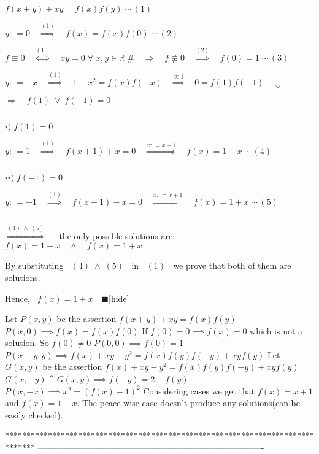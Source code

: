 \begin{solution}

$ \boxed { f(x+y) + xy = f(x)f(y) } \; \cdots \, (1) $

$ y: \, = 0 \quad \stackrel {(1)} {\Longrightarrow} \quad \boxed { f(x) = f(x)f(0) } \; \cdots \, (2) $

$ f \equiv 0 \quad \stackrel {(1)} {\Longleftrightarrow} \quad xy = 0 \; \forall \; x, y \in \mathbb{R} \; \# \quad \Longrightarrow \quad f \not\equiv 0 \quad \stackrel {(2)} {\Longrightarrow}  \quad \boxed { f(0) = 1 } \; \cdots \, (3) $

$ y: \, = -x \quad \stackrel {(1)} {\Longrightarrow} \quad 1 - x^2 = f(x)f(-x) \quad \stackrel {x: \, 1} {\Longrightarrow} \quad 0 = f(1)f(-1) \quad \Downarrow $  

$ \Longrightarrow \quad \boxed{ f(1) \; \vee \; f(-1) = 0 } $

$~$

$ i) \; f(1) = 0 $

$ y: \, = 1 \quad \stackrel {(1)} {\Longrightarrow} \quad f(x+1) + x = 0 \quad \stackrel {x: \, = x-1} {\Longrightarrow} \quad \boxed { f(x) = 1 - x } \; \cdots \, (4) $

$~$

$ ii) \; f(-1) = 0 $

$ y: \, = -1 \quad \stackrel {(1)} {\Longrightarrow} \quad f(x-1) - x = 0 \quad \stackrel {x: \, = x+1} {\Longrightarrow} \quad \boxed { f(x) = 1 + x } \; \cdots \, (5) $

$~$

$ \stackrel {(4) \; \wedge \; (5)} {\Longrightarrow} $ $~$ $~$ the only possible solutions are: $~$ $~$ $ f(x) = 1 - x \quad \wedge \quad f(x) = 1 + x$

By substituting $~$ $ (4) \; \wedge \; (5) $ $~$ in $~$ $ (1)$ $~$ we prove that both of them are solutions.

Hence, $~$ $ f(x) = 1 \pm x \quad \blacksquare $[\/hide]
\end{solution}



\begin{solution}
	Let $P(x,y)$ be the assertion $f(x+y)+xy=f(x)f(y)$
$P(x,0)\implies f(x)=f(x)f(0)$
If $f(0)=0\implies f(x)=0$ which is not a solution.
So $f(0)\neq 0$
$P(0,0)\implies f(0)=1$
$P(x-y,y)\implies f(x)+xy-y^{2}=f(x)f(y)f(-y)+xyf(y)$
Let $G(x,y)$ be the assertion $f(x)+xy-y^{2}=f(x)f(y)f(-y)+xyf(y)$
$G(x,-y)$ ^ $G(x,y)\implies f(-y)=2-f(y)$
$P(x,-x)\implies x^{2}=(f(x)-1)^{2}$
Considering cases we get that $f(x)=x+1$ and $f(x)=1-x$.
The peace-wise case doesn't produce any solutions(can be easily checked).
\end{solution}
*******************************************************************************
-------------------------------------------------------------------------------


